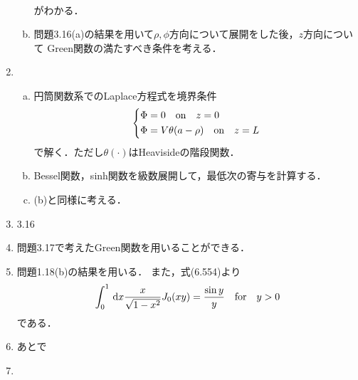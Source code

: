 \begin{enumerate}[label={\large 3.\arabic*}]
\begin{enumerate}[(a)]
\begin{gather}
        \end{gather}%
        がわかる．
      \item 問題3.16(a)の結果を用いて$\rho, \phi$方向について展開をした後，$z$方向について
        Green関数の満たすべき条件を考える．
    \end{enumerate}
  \item 
    \begin{enumerate}[(a)]%
      \item  円筒関数系でのLaplace方程式を境界条件
        \begin{gather}%
          \begin{dcases}%
            \Phi = 0\qqtext{on} z = 0\\
            \Phi = V\theta(a-\rho) \qqtext{on} z = L
          \end{dcases}%
        \end{gather}%
        で解く．ただし$\theta(\cdot)$はHeavisideの階段関数．
      \item Bessel関数，sinh関数を級数展開して，最低次の寄与を計算する．
      \item (b)と同様に考える．
    \end{enumerate}%
  \item 3.16
  \item 問題3.17で考えたGreen関数を用いることができる．
  \item 問題1.18(b)の結果を用いる．
    また，\cite{gradshteyn2014}式(6.554)より
    \begin{gather}%
      \int_0^1  \dl{x} \frac{x}{\sqrt{1-x^2}} J_0(xy) = \frac{\sin y}{y} \qqtext{for} y > 0
    \end{gather}%
    である．
  \item あとで
  \item 
\end{enumerate}
